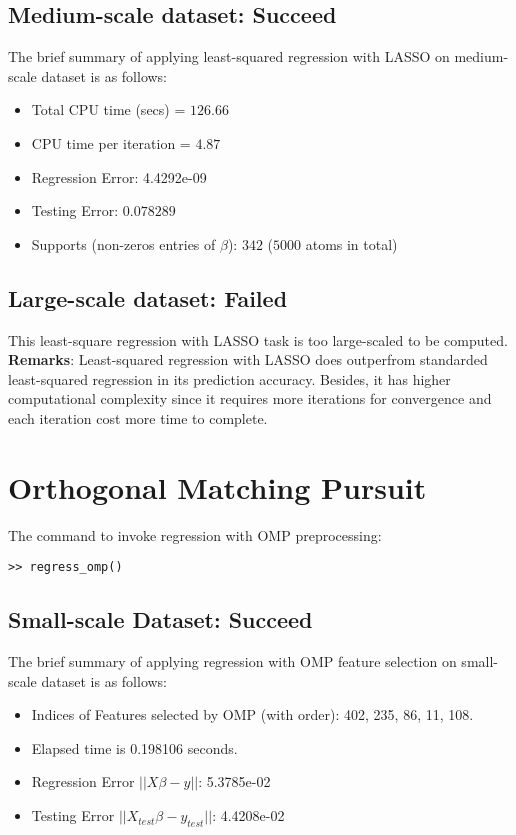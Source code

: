 \documentclass[11pt,a4paper]{report}
\begin{document}
\subsection{Medium-scale dataset: Succeed}
The brief summary of applying least-squared regression with LASSO on
medium-scale dataset is as follows:
\begin{itemize}
 \item   Total CPU time (secs)  = $126.66$

 \item   CPU time per iteration = $4.87$  

 \item   Regression Error: 4.4292e-09
 
 \item   Testing Error: $0.078289$

 \item   Supports (non-zeros entries of $\beta$): $342$ ($5000$ atoms in total)
\end{itemize}

\subsection{Large-scale dataset: Failed}
    
    This least-square regression with LASSO task is too large-scaled to be computed. 
\\[0.3cm]

\noindent 
{\bf Remarks}: Least-squared regression
with LASSO does outperfrom standarded least-squared regression in its
prediction accuracy. Besides, it has higher computational complexity since it
requires more iterations for convergence and each iteration cost more time to
complete.

\newpage
\section{Orthogonal Matching Pursuit}
The command to invoke regression with OMP preprocessing:
\begin{verbatim}
>> regress_omp()
\end{verbatim}

\subsection{Small-scale Dataset: Succeed}
The brief summary of applying regression with OMP feature selection on
small-scale dataset is as follows:
\begin{itemize}
\item Indices of Features selected by OMP (with order): 402, 235, 86, 11, 108. 
\item Elapsed time is 0.198106 seconds.
\item Regression Error $||X \beta - y||$: 5.3785e-02
\item Testing Error $||X_{test} \beta - y_{test}||$: 4.4208e-02
\end{itemize}
\end{document}

